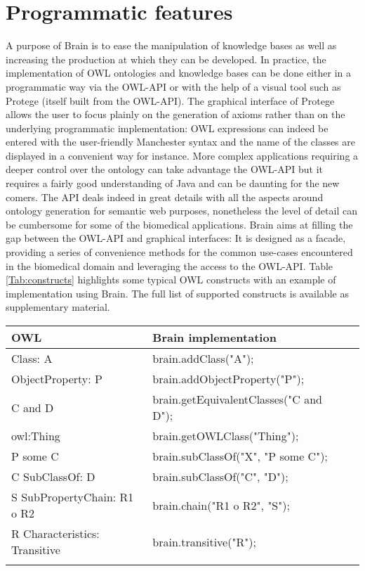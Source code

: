\documentclass{bioinfo}
\begin{document}
\section{Programmatic features}
A purpose of Brain is to ease the manipulation of knowledge bases as well as increasing the production at which they can be developed.
In practice, the implementation of OWL ontologies and knowledge bases can be done either in a programmatic way via the OWL-API or with the
help of a visual tool such as Protege (itself built from the OWL-API). The graphical interface of Protege allows the user to focus 
plainly on the generation of axioms rather than on the underlying programmatic implementation:
OWL expressions can indeed be entered 
with the user-friendly Manchester syntax and the name of the classes are displayed in a convenient way for instance. 
More complex applications requiring a deeper control over the ontology
can take advantage the OWL-API but it requires a fairly good understanding of Java and can be daunting for the new comers.
The API deals indeed in great details with all the aspects around ontology generation for semantic web purposes, nonetheless the 
level of detail can be cumbersome for some of the biomedical applications. Brain aims at filling the gap between the OWL-API
and graphical interfaces: It is designed as a facade, providing a series of convenience methods for the common
use-cases encountered in the biomedical domain and leveraging the access to the OWL-API. 
Table \ref{Tab:constructs} highlights some typical OWL constructs 
with an example of implementation using Brain. The full list of supported constructs is available as supplementary material.
\begin{table}[!h]
{\begin{tabular}{llll}\toprule
OWL & Brain implementation\\\midrule
Class: A & brain.addClass("A");\\
ObjectProperty: P & brain.addObjectProperty("P");\\
C and D & brain.getEquivalentClasses("C and D");\\
owl:Thing & brain.getOWLClass("Thing");\\
P some C & brain.subClassOf("X", "P some C");\\
C SubClassOf: D & brain.subClassOf("C", "D");\\
S SubPropertyChain: R1 o R2 & brain.chain("R1 o R2", "S");\\
R Characteristics: Transitive & brain.transitive("R");\\\botrule
\end{tabular}}{}
\end{table}
\end{document}
